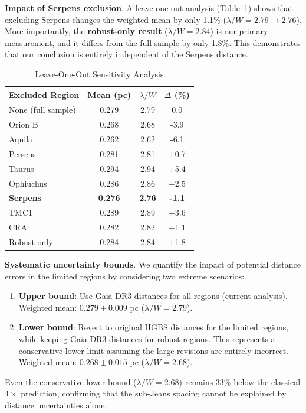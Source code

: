 \documentclass[twoside,twocolumn]{mnras}
\begin{document}
\textbf{Impact of Serpens exclusion}. A leave-one-out analysis (Table~\ref{tab:leave_one_out}) shows that excluding Serpens changes the weighted mean by only 1.1\% ($\lambda/W = 2.79 \to 2.76$). More importantly, the \textbf{robust-only result} ($\lambda/W = 2.84$) is our primary measurement, and it differs from the full sample by only 1.8\%. This demonstrates that our conclusion is entirely independent of the Serpens distance.

\begin{table}[h]
\caption{Leave-One-Out Sensitivity Analysis}
\label{tab:leave_one_out}
\begin{tabular}{lccc}
\toprule
Excluded Region & Mean (pc) & $\lambda/W$ & $\Delta$ (\%) \\
\midrule
None (full sample) & 0.279 & 2.79 & 0.0 \\
Orion B & 0.268 & 2.68 & -3.9 \\
Aquila & 0.262 & 2.62 & -6.1 \\
Perseus & 0.281 & 2.81 & +0.7 \\
Taurus & 0.294 & 2.94 & +5.4 \\
Ophiuchus & 0.286 & 2.86 & +2.5 \\
\textbf{Serpens} & \textbf{0.276} & \textbf{2.76} & \textbf{-1.1} \\
TMC1 & 0.289 & 2.89 & +3.6 \\
CRA & 0.282 & 2.82 & +1.1 \\
\midrule
Robust only & 0.284 & 2.84 & +1.8 \\
\bottomrule
\end{tabular}
\end{table}

\textbf{Systematic uncertainty bounds}. We quantify the impact of potential distance errors in the limited regions by considering two extreme scenarios:
\begin{enumerate}
    \item \textbf{Upper bound}: Use Gaia DR3 distances for all regions (current analysis). Weighted mean: $0.279 \pm 0.009$ pc ($\lambda/W = 2.79$).
    \item \textbf{Lower bound}: Revert to original HGBS distances for the limited regions, while keeping Gaia DR3 distances for robust regions. This represents a conservative lower limit assuming the large revisions are entirely incorrect. Weighted mean: $0.268 \pm 0.015$ pc ($\lambda/W = 2.68$).
\end{enumerate}
Even the conservative lower bound ($\lambda/W = 2.68$) remains 33\% below the classical $4\times$ prediction, confirming that the sub-Jeans spacing cannot be explained by distance uncertainties alone.
\end{document}
